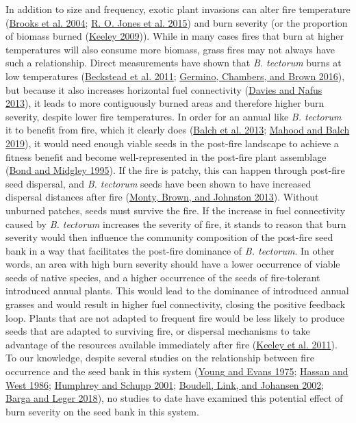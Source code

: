 \documentclass[
  12pt,
]{article}
\begin{document}
In addition to size and frequency, exotic plant invasions can alter fire
temperature (\protect\hyperlink{ref-Brooks2004}{Brooks et al. 2004};
\protect\hyperlink{ref-Jones2015}{R. O. Jones et al. 2015}) and burn
severity (or the proportion of biomass burned
(\protect\hyperlink{ref-Keeley2009}{Keeley 2009})). While in many cases
fires that burn at higher temperatures will also consume more biomass,
grass fires may not always have such a relationship. Direct measurements
have shown that \emph{B. tectorum} burns at low temperatures
(\protect\hyperlink{ref-Beckstead2011}{Beckstead et al. 2011};
\protect\hyperlink{ref-Germino2016}{Germino, Chambers, and Brown 2016}),
but because it also increases horizontal fuel connectivity
(\protect\hyperlink{ref-Davies2013}{Davies and Nafus 2013}), it leads to
more contiguously burned areas and therefore higher burn severity,
despite lower fire temperatures. In order for an annual like \emph{B.
tectorum} it to benefit from fire, which it clearly does
(\protect\hyperlink{ref-Balch2013}{Balch et al. 2013};
\protect\hyperlink{ref-Mahood2019}{Mahood and Balch 2019}), it would
need enough viable seeds in the post-fire landscape to achieve a fitness
benefit and become well-represented in the post-fire plant assemblage
(\protect\hyperlink{ref-Bond1995}{Bond and Midgley 1995}). If the fire
is patchy, this can happen through post-fire seed dispersal, and
\emph{B. tectorum} seeds have been shown to have increased dispersal
distances after fire (\protect\hyperlink{ref-Monty2013}{Monty, Brown,
and Johnston 2013}). Without unburned patches, seeds must survive the
fire. If the increase in fuel connectivity caused by \emph{B. tectorum}
increases the severity of fire, it stands to reason that burn severity
would then influence the community composition of the post-fire seed
bank in a way that facilitates the post-fire dominance of \emph{B.
tectorum}. In other words, an area with high burn severity should have a
lower occurrence of viable seeds of native species, and a higher
occurrence of the seeds of fire-tolerant introduced annual plants. This
would lead to the dominance of introduced annual grasses and would
result in higher fuel connectivity, closing the positive feedback loop.
Plants that are not adapted to frequent fire would be less likely to
produce seeds that are adapted to surviving fire, or dispersal
mechanisms to take advantage of the resources available immediately
after fire (\protect\hyperlink{ref-Keeley2011}{Keeley et al. 2011}). To
our knowledge, despite several studies on the relationship between fire
occurrence and the seed bank in this system
(\protect\hyperlink{ref-Young1975}{Young and Evans 1975};
\protect\hyperlink{ref-Hassan1986}{Hassan and West 1986};
\protect\hyperlink{ref-Humphrey2001}{Humphrey and Schupp 2001};
\protect\hyperlink{ref-Boudell2002}{Boudell, Link, and Johansen 2002};
\protect\hyperlink{ref-Barga2018}{Barga and Leger 2018}), no studies to
date have examined this potential effect of burn severity on the seed
bank in this system.
\end{document}
